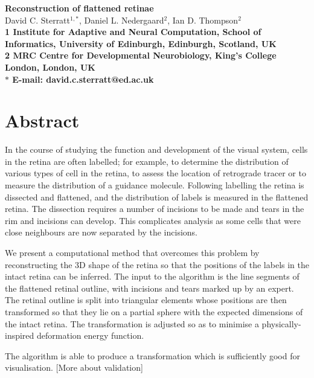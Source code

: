 \documentclass[10pt]{article}
\date{}
\newcommand{\todo}[1]{{\color{red}[#1]}}
\begin{document}
\begin{flushleft}
{\Large
\textbf{Reconstruction of flattened retinae}
}
\\
David C. Sterratt$^{1,\ast}$, Daniel L. Nedergaard$^{2}$, Ian
D. Thompson$^{2}$
\\
\bf{1} Institute for Adaptive and Neural Computation, School of
Informatics, University of Edinburgh, Edinburgh, Scotland, UK
\\
\bf{2} MRC Centre for Developmental Neurobiology, King's College
London, London, UK
\\
$\ast$ E-mail: david.c.sterratt@ed.ac.uk
\end{flushleft}

\section*{Abstract}

In the course of studying the function and development of the visual
system, cells in the retina are often labelled; for example, to
determine the distribution of various types of cell in the retina, to
assess the location of retrograde tracer or to measure the
distribution of a guidance molecule.  Following labelling the retina
is dissected and flattened, and the distribution of labels is measured
in the flattened retina.  The dissection requires a number of
incisions to be made and tears in the rim and incisions can
develop. This complicates analysis as some cells that were close
neighbours are now separated by the incisions.

We present a computational method that overcomes this problem by
reconstructing the 3D shape of the retina so that the positions of the
labels in the intact retina can be inferred. The input to the
algorithm is the line segments of the flattened retinal outline, with
incisions and tears marked up by an expert. The retinal outline is
split into triangular elements whose positions are then transformed so
that they lie on a partial sphere with the expected dimensions of the
intact retina.  The transformation is adjusted so as to minimise a
physically-inspired deformation energy function.


The algorithm is able to produce a transformation which is
sufficiently good for visualisation. \todo{More about validation} 
\end{document}
